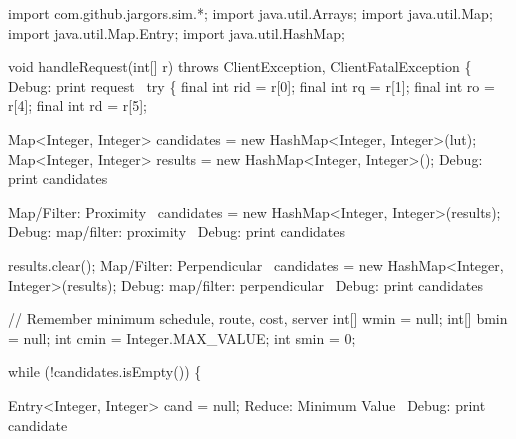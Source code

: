 \nwenddocs{}\endmoddef\nwstartdeflinemarkup{}\nwenddeflinemarkup
import com.github.jargors.sim.*;
import java.util.Arrays;
import java.util.Map;
import java.util.Map.Entry;
import java.util.HashMap;
\nwendcode{}\nwdocspar

\nwenddocs{}\endmoddef\nwstartdeflinemarkup{}\nwenddeflinemarkup
void handleRequest(int[] r) throws ClientException, ClientFatalException \{
  \LA{}Debug: print request~{\nwtagstyle{}}\RA{}
  try \{
    final int rid = r[0];
    final int rq  = r[1];
    final int ro  = r[4];
    final int rd  = r[5];

    Map<Integer, Integer> candidates = new HashMap<Integer, Integer>(lut);
    Map<Integer, Integer> results = new HashMap<Integer, Integer>();
    \LA{}Debug: print candidates~{\nwtagstyle{}}\RA{}

    \LA{}Map/Filter: Proximity~{\nwtagstyle{}}\RA{}
    candidates = new HashMap<Integer, Integer>(results);
    \LA{}Debug: map/filter: proximity~{\nwtagstyle{}}\RA{}
    \LA{}Debug: print candidates~{\nwtagstyle{}}\RA{}

    results.clear();
    \LA{}Map/Filter: Perpendicular~{\nwtagstyle{}}\RA{}
    candidates = new HashMap<Integer, Integer>(results);
    \LA{}Debug: map/filter: perpendicular~{\nwtagstyle{}}\RA{}
    \LA{}Debug: print candidates~{\nwtagstyle{}}\RA{}

    // Remember minimum schedule, route, cost, server
    int[] wmin = null;
    int[] bmin = null;
    int cmin = Integer.MAX_VALUE;
    int smin = 0;

    while (!candidates.isEmpty()) \{

      Entry<Integer, Integer> cand = null;
      \LA{}Reduce: Minimum Value~{\nwtagstyle{}}\RA{}
      \LA{}Debug: print candidate~{\nwtagstyle{}}\RA{}

